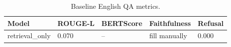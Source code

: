 \begin{table}[h]
\centering
\caption{Baseline English QA metrics.}
\label{tab:english-metrics}
\begin{tabular}{lllll}
\hline
Model & ROUGE-L & BERTScore & Faithfulness & Refusal \\
\hline
retrieval\_only & 0.070 & -- & fill manually & 0.000 \\
\hline
\end{tabular}
\end{table}